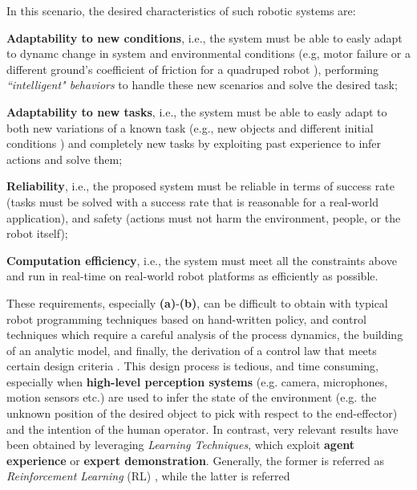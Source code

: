 In this scenario, the desired characteristics of such robotic systems are: \begin{enumerate*}[label=\textbf{(\alph*)}]
    \item \textbf{Adaptability to new conditions}, i.e., the system must be able to easly adapt to dynamc change in system and environmental conditions (e.g, motor failure or a different ground's coefficient of friction for a quadruped robot \cite{anne2021meta_learning_fast_adaptive}), performing \textit{``intelligent" behaviors} to handle these new scenarios and solve the desired task;
    \item \textbf{Adaptability to new tasks}, i.e., the system must be able to easly adapt to both new variations of a known task (e.g., new objects and different initial conditions \cite{mandi2022towards_more_generalizable_one_shot}) and completely new tasks \cite{jang2022bc_z} by exploiting past experience to infer actions and solve them;
    \item \textbf{Reliability}, i.e., the proposed system must be reliable in terms of success rate (tasks must be solved with a success rate that is reasonable for a real-world application), and safety (actions must not harm the environment, people, or the robot itself);
    \item \textbf{Computation efficiency}, i.e., the system must meet all the constraints above and run in real-time on real-world robot platforms as efficiently as possible.
\end{enumerate*}
\newline These requirements, especially \textbf{(a)}-\textbf{(b)}, can be difficult to obtain with typical robot programming techniques based on hand-written
policy, and control techniques which require a careful analysis of the process dynamics, the building of an analytic
model, and finally, the derivation of a control law that meets certain design criteria
\cite{hafner2011reinforcement_in_feedback_controll}. This design process is tedious, and time consuming, especially when
\textbf{high-level perception systems} (e.g. camera, microphones, motion sensors etc.) are used to infer the state of
the environment (e.g. the unknown position of the desired object to pick with respect to the end-effector) and the
intention of the human operator. \newline In contrast, very relevant results have been obtained by leveraging
\textit{Learning Techniques}, which exploit \textbf{agent experience} or \textbf{expert demonstration}. Generally, the
former is referred as \textit{Reinforcement Learning} (RL) \cite{sutton2018reinforcement}, while the latter is referred
